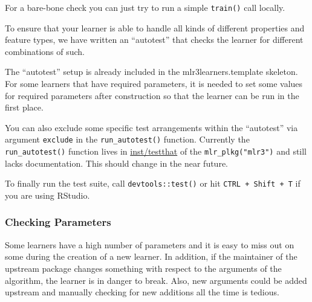 \documentclass[]{scrbook}
\newenvironment{Shaded}{\begin{snugshade}}{\end{snugshade}}
\newcommand{\CommentTok}[1]{\textcolor[rgb]{0.56,0.35,0.01}{\textit{#1}}}
\newcommand{\KeywordTok}[1]{\textcolor[rgb]{0.13,0.29,0.53}{\textbf{#1}}}
\newcommand{\NormalTok}[1]{#1}
\newcommand{\OperatorTok}[1]{\textcolor[rgb]{0.81,0.36,0.00}{\textbf{#1}}}
\newcommand{\StringTok}[1]{\textcolor[rgb]{0.31,0.60,0.02}{#1}}
\renewenvironment{Shaded} {\begin{snugshade}\small} {\end{snugshade}}
\begin{document}
For a bare-bone check you can just try to run a simple \texttt{train()} call locally.

\begin{Shaded}
\end{Shaded}

To ensure that your learner is able to handle all kinds of different properties and feature types, we have written an ``autotest'' that checks the learner for different combinations of such.

The ``autotest'' setup is already included in the mlr3learners.template skeleton.
For some learners that have required parameters, it is needed to set some values for required parameters after construction so that the learner can be run in the first place.

You can also exclude some specific test arrangements within the ``autotest'' via argument \texttt{exclude} in the \texttt{run\_autotest()} function.
Currently the \texttt{run\_autotest()} function lives in \href{https://github.com/mlr-org/mlr3/blob/f16326bf34bcac59c3b0a2fdbcf90dbebb3b4bbc/inst/testthat/helper_autotest.R}{inst/testthat} of the \texttt{mlr\_plkg("mlr3")} and still lacks documentation.
This should change in the near future.

To finally run the test suite, call \texttt{devtools::test()} or hit \texttt{CTRL\ +\ Shift\ +\ T} if you are using RStudio.

\hypertarget{checking-parameters}{%
\subsubsection{Checking Parameters}\label{checking-parameters}}

Some learners have a high number of parameters and it is easy to miss out on some during the creation of a new learner.
In addition, if the maintainer of the upstream package changes something with respect to the arguments of the algorithm, the learner is in danger to break.
Also, new arguments could be added upstream and manually checking for new additions all the time is tedious.
\end{document}
